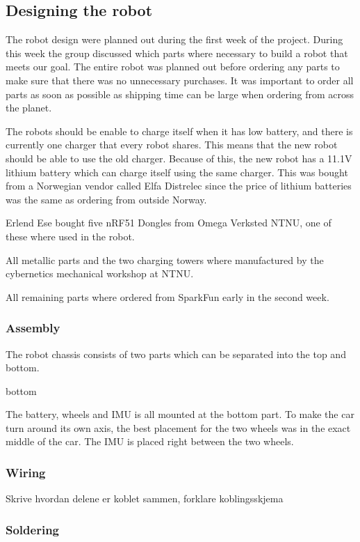 \subsection{Designing the robot}
The robot design were planned out during the first week of the project. During this week the group discussed which parts where necessary to build a robot that meets our goal. The entire robot was planned out before ordering any parts to make sure that there was no unnecessary purchases. It was important to order all parts as soon as possible as shipping time can be large when ordering from across the planet.

The robots should be enable to charge itself when it has low battery, and there is currently one charger that every robot shares. This means that the new robot should be able to use the old charger. Because of this, the new robot has a 11.1V lithium battery which can charge itself using the same charger. This was bought from a Norwegian vendor called Elfa Distrelec\cite{elfa} since the price of lithium batteries was the same as ordering from outside Norway.

Erlend Ese bought five nRF51 Dongles from Omega Verksted NTNU, one of these where used in the robot.

All metallic parts and the two charging towers where manufactured by the cybernetics mechanical workshop at NTNU.


All remaining parts where ordered from SparkFun early in the second week.



\subsubsection{Assembly}
The robot chassis consists of two parts which can be separated into the top and bottom.

bottom

The battery, wheels and IMU is all mounted at the bottom part. To make the car turn around its own axis, the best placement for the two wheels was in the exact middle of the car. The IMU is placed right between the two wheels. 

\subsubsection{Wiring}
Skrive hvordan delene er koblet sammen, forklare koblingsskjema

\subsubsection{Soldering}